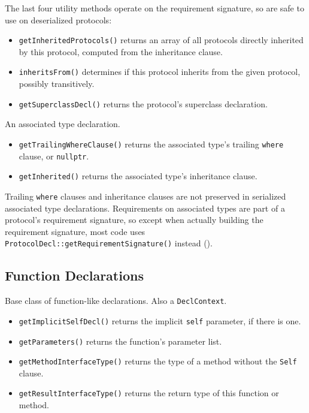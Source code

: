 \documentclass[../generics]{subfiles}
\begin{document}
The last four utility methods operate on the requirement signature, so are safe to use on deserialized protocols:
\begin{itemize}
\item \texttt{getInheritedProtocols()} returns an array of all protocols directly inherited by this protocol, computed from the inheritance clause.
\item \texttt{inheritsFrom()} determines if this protocol inherits from the given protocol, possibly transitively.
\item \texttt{getSuperclassDecl()} returns the protocol's superclass declaration.
\end{itemize}

An associated type declaration.
\begin{itemize}
\item \texttt{getTrailingWhereClause()} returns the associated type's trailing \texttt{where} clause, or \texttt{nullptr}.
\item \texttt{getInherited()} returns the associated type's inheritance clause.
\end{itemize}

Trailing \texttt{where} clauses and inheritance clauses are not preserved in serialized associated type declarations. Requirements on associated types are part of a protocol's requirement signature, so except when actually building the requirement signature, most code uses \texttt{ProtocolDecl::getRequirementSignature()} instead ().

\subsection*{Function Declarations}

Base class of function-like declarations. Also a \texttt{DeclContext}.
\begin{itemize}
\item \texttt{getImplicitSelfDecl()} returns the implicit \texttt{self} parameter, if there is one.
\item \texttt{getParameters()} returns the function's parameter list.
\item \texttt{getMethodInterfaceType()} returns the type of a method without the \texttt{Self} clause.
\item \texttt{getResultInterfaceType()} returns the return type of this function or method.
\end{itemize}
\end{document}
